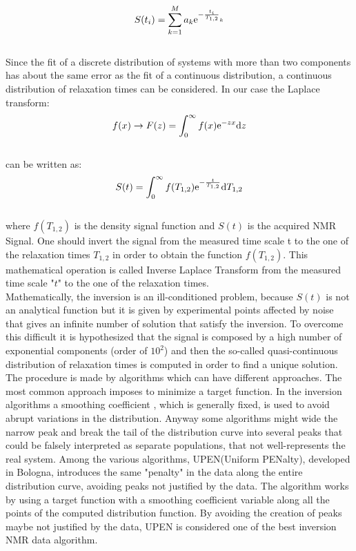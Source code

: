 \documentclass[a4paper,11pt]{report}
\begin{document}
\begin{equation} \label{Multiexponentialbehaviour}
\large{S(t_i)=\sum_{k=1}^{M} a_k \mathrm{e}^{-\frac{t_i}{T_{1,2}}_k}}
	\end{equation}
	\\
Since the fit of a discrete distribution of systems with more than two components has about the same error as the fit of a continuous distribution, a continuous distribution of relaxation times can be considered. 
     In our case the Laplace transform:
 \begin{equation} \label{laplace trans}
	\large { f(x) \rightarrow F(z) = \int_{0}^{\infty} f(x) \mathrm{e}^{-zx} \mathrm{d}z}
\end{equation}
\\
 can be written as:
\begin{equation}\label{Laplace our case}
	\large { S(t) = \int_{0}^{\infty} f(T_{1,2}) \mathrm{e}^{- \frac{t}{T_{1,2}}} \mathrm{d}T_{1,2}}
\end{equation}\\
where $f(T_{1,2})$ is the density signal function and $S(t)$ is the acquired NMR Signal. 
One should invert the signal from the measured time scale t to the one of the relaxation times $T_{1,2}$ in order to obtain the function $f(T_{1,2})$. This mathematical operation is called Inverse Laplace Transform from the measured time scale "$t$" to the one of the relaxation times.\\
Mathematically, the inversion is an ill-conditioned problem, because $S(t)$ is not an analytical function but it is given by experimental points affected by noise that gives an infinite number of solution that satisfy the inversion. To overcome this difficult it is hypothesized that the signal is composed by a high number of exponential components (order of $10^{2}$) and then the so-called quasi-continuous distribution of relaxation times is computed in order to find a unique solution.
The procedure is made by algorithms which can have different approaches\cite{sei}. The most common approach imposes to minimize a target function. In the inversion algorithms a smoothing coefficient , which is generally fixed, is used to avoid abrupt variations in the distribution.
Anyway some algorithms might wide the narrow peak and break the tail of the distribution curve into several peaks that could be falsely interpreted as separate populations, that not well-represents the real system. Among the various algorithms, UPEN(Uniform PENalty), developed in Bologna, introduces the same "penalty" in the data along the entire distribution curve, avoiding peaks not justified by the data. The algorithm works by using a target function with a smoothing coefficient variable along all the points of the computed distribution function. By avoiding the creation of peaks maybe not justified by the data, UPEN is considered one of the best inversion NMR data algorithm\cite{tredici, quattordici}.
\end{document}
